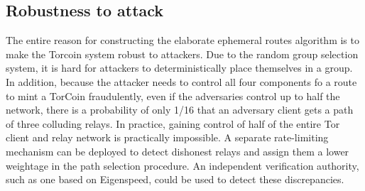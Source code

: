 \subsection{Robustness to attack}
The entire reason for constructing the elaborate ephemeral routes algorithm is to make the Torcoin system robust to attackers.
Due to the random group selection system, it is hard for attackers to deterministically place themselves in a group. In addition, because the attacker needs to control all four components fo a route to mint a TorCoin fraudulently, even if the adversaries control up to half the network, there is a probability of only 1/16 that an adversary client gets a path of three colluding relays. In practice, gaining control of half of the entire Tor client and relay network is practically impossible. 
A separate rate-limiting mechanism can be deployed to detect dishonest relays and assign them a lower weightage in the path selection procedure. An independent verification authority, such as one based on Eigenspeed, could be used to detect these discrepancies.